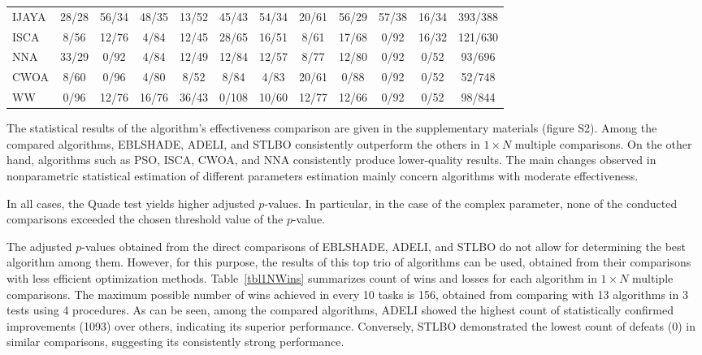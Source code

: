 \documentclass[a4paper,fleqn]{cas-sc}
\begin{document}
\begin{table}[<options>]
\begin{tabular*}{\tblwidth}{@{}LCCCCCCCCCCC@{}}
IJAYA &  28/28 &  56/34 &  48/35 & 13/52  & 45/43 &  54/34 &  20/61 & 56/29  & 57/38  & 16/34  & 393/388\\
ISCA & 8/56  & 12/76  & 4/84  & 12/45  & 28/65  & 16/51  & 8/61  & 17/68  & 0/92  & 16/32  & 121/630\\
NNA & 33/29  & 0/92  & 4/84  & 12/49  & 12/84  & 12/57  & 8/77  & 12/80  & 0/92& 0/52  & 93/696\\
CWOA & 8/60  & 0/96  &  4/80& 8/52  & 8/84& 4/83  & 20/61  & 0/88  & 0/92 & 0/52  & 52/748\\
WW & 0/96  & 12/76  & 16/76&  36/43 & 0/108 & 10/60 & 12/77  & 12/66  & 0/92& 0/52  & 98/844\\
\bottomrule
\end{tabular*}
\end{table}


The statistical results of the algorithm's effectiveness comparison are given in the supplementary materials (figure S2).
Among the compared algorithms, EBLSHADE, ADELI, and STLBO consistently outperform the others in $1\times N$ multiple comparisons.
On the other hand, algorithms such as PSO, ISCA, CWOA, and NNA consistently produce lower-quality results.
The main changes observed in nonparametric statistical estimation of different parameters estimation
mainly concern algorithms with moderate effectiveness.



In all cases, the Quade test yields higher adjusted $p$-values.
In particular, in the case of the complex parameter, none of the conducted comparisons exceeded the chosen threshold value of the $p$-value.

The adjusted $p$-values obtained from the direct comparisons of EBLSHADE, ADELI, and STLBO
do not allow for determining the best algorithm among them.
However, for this purpose, the results of this top trio of algorithms can be used,
obtained from their comparisons with less efficient optimization methods.
Table~\ref{tbl1NWins} summarizes count of wins and losses for each algorithm in $1\times N$ multiple comparisons.
The maximum possible number of wins achieved in every 10 tasks is 156,
obtained from comparing with 13 algorithms in 3 tests using 4 procedures.
As can be seen, among the compared algorithms,
ADELI showed the highest count of statistically confirmed improvements (1093) over others,
indicating its superior performance.
Conversely, STLBO demonstrated the lowest count of defeats (0) in similar comparisons, suggesting its consistently strong performance.
\end{document}
